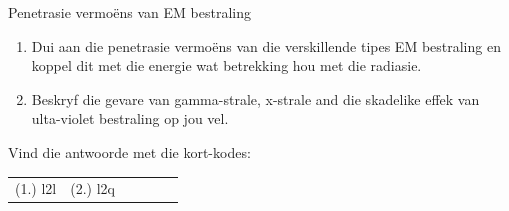         \label{m38779*uid27}
            \begin{exercises}{Penetrasie vermo\"ens van EM bestraling}
            \nopagebreak
        \label{m38779*id189729}\begin{enumerate}[noitemsep, label=\textbf{\arabic*}. ] 
            \label{m38779*uid28}\item Dui aan die penetrasie vermo\"ens van die verskillende tipes EM bestraling en koppel dit met die energie wat betrekking hou met die radiasie. \newline
\label{m38779*uid29}\item Beskryf die gevare van gamma-strale, x-strale and die skadelike effek van ulta-violet bestraling op jou vel. \newline
\end{enumerate}
    \label{m38779*cid8}
\par {} Vind die antwoorde met die kort-kodes:
 \par \begin{tabular}[h]{cccccc}
 (1.) l2l  &  (2.) l2q  & \end{tabular}
\end{exercises}


